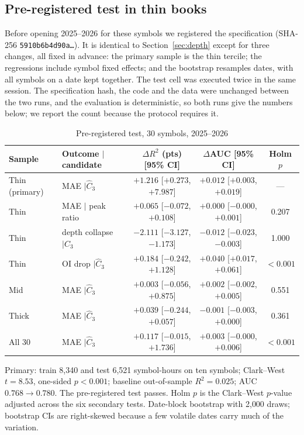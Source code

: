 \documentclass[12pt]{article}
\theoremstyle{definition}
\theoremstyle{remark}
\begin{document}
\subsection{Pre-registered test in thin books}\label{sec:x6}
Before opening 2025--2026 for these symbols we registered the specification (SHA-256 \texttt{5910b6b4d90a\ldots}). It is identical to Section~\ref{sec:depth} except for three changes, all fixed in advance: the primary sample is the thin tercile; the regressions include symbol fixed effects; and the bootstrap resamples dates, with all symbols on a date kept together. The test cell was executed twice in the same session. The specification hash, the code and the data were unchanged between the two runs, and the evaluation is deterministic, so both runs give the numbers below; we report the count because the protocol requires it.

\begin{table}[t]\centering
\begin{threeparttable}
\caption{Pre-registered test, 30 symbols, 2025--2026}\label{tab:x6}
\small\setlength{\tabcolsep}{4pt}
\begin{tabular}{llccc}
\toprule
Sample & Outcome $\mid$ candidate & $\Delta R^2$ (pts) [95\% CI] & $\Delta$AUC [95\% CI] & Holm $p$\\
\midrule
Thin (primary) & MAE $\mid\hat C_3$ & $+1.216$ [$+0.273$, $+7.987$] & $+0.012$ [$+0.003$, $+0.019$] & ---\\
Thin & MAE $\mid$ peak ratio & $+0.065$ [$-0.072$, $+0.108$] & $+0.000$ [$-0.000$, $+0.001$] & 0.207\\
Thin & depth collapse $\mid\hat C_3$ & $-2.111$ [$-3.127$, $-1.173$] & $-0.012$ [$-0.023$, $-0.003$] & 1.000\\
Thin & OI drop $\mid\hat C_3$ & $+0.184$ [$-0.242$, $+1.128$] & $+0.040$ [$+0.017$, $+0.061$] & $<0.001$\\
Mid & MAE $\mid\hat C_3$ & $+0.003$ [$-0.056$, $+0.875$] & $+0.002$ [$-0.002$, $+0.005$] & 0.551\\
Thick & MAE $\mid\hat C_3$ & $+0.039$ [$-0.244$, $+0.057$] & $-0.001$ [$-0.003$, $+0.000$] & 0.361\\
All 30 & MAE $\mid\hat C_3$ & $+0.117$ [$-0.015$, $+1.736$] & $+0.003$ [$-0.000$, $+0.006$] & $<0.001$\\
\bottomrule
\end{tabular}
\begin{tablenotes}\footnotesize\item Primary: train 8{,}340 and test 6{,}521 symbol-hours on ten symbols; Clark--West $t=8.53$, one-sided $p<0.001$; baseline out-of-sample $R^2=0.025$; AUC $0.768\to0.780$. The pre-registered test passes. Holm $p$ is the Clark--West $p$-value adjusted across the six secondary tests. Date-block bootstrap with 2{,}000 draws; bootstrap CIs are right-skewed because a few volatile dates carry much of the variation. \end{tablenotes}
\end{threeparttable}
\end{table}
\end{document}
